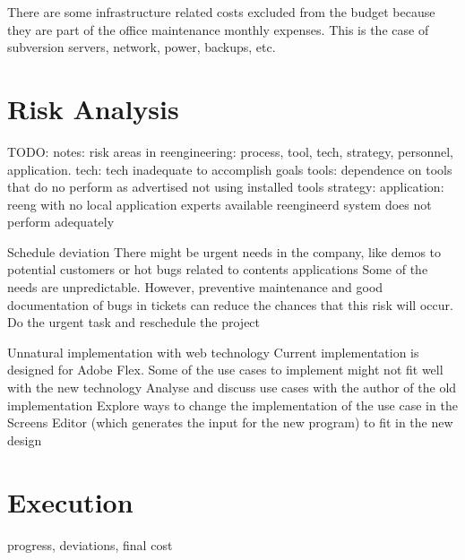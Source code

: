 There are some infrastructure related costs excluded from the budget because they are part of the office maintenance monthly expenses.
This is the case of subversion servers, network, power, backups, etc. 

\section{Risk Analysis}
TODO: notes: risk areas in reengineering: process, tool,  tech, strategy, personnel, application.
tech:  tech inadequate to accomplish goals
tools: dependence on tools that do no perform as advertised
not using installed tools
strategy: 
application: reeng with no local application experts available 
reengineerd system does not perform adequately

\label{sec:risk}
\begin{risk}
{Schedule deviation}
{There might be urgent needs in the company, like demos to potential customers or hot bugs related to contents applications}
{Some of the needs are unpredictable. However, preventive maintenance and good documentation of bugs in tickets can reduce the chances that this risk will occur.}
{Do the urgent task and reschedule the project}
\end{risk}

\begin{risk}
{Unnatural implementation with web technology}
{Current implementation is designed for Adobe Flex. Some of the use cases to implement might not fit well with the new technology}
{Analyse and discuss use cases with the author of the old implementation}
{Explore ways to change the implementation of the use case in the Screens Editor (which generates the input for the new program) to fit in the new design}
\end{risk}


\section{Execution}
progress, deviations, final cost
